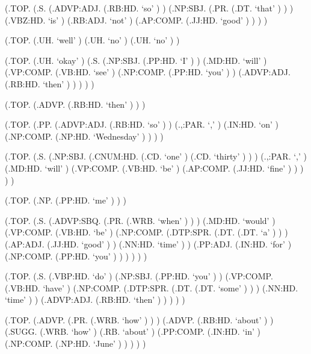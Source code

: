 \documentclass[10pt]{article}
\begin{document}
\begin{parsetree}  (.TOP. (.S. (.ADVP:ADJ. (.RB:HD. `so' ) ) (.NP:SBJ. (.PR. (.DT. `that' ) ) ) (.VBZ:HD. `is' ) (.RB:ADJ. `not' ) (.AP:COMP. (.JJ:HD. `good' ) ) ) ) \end{parsetree}

\begin{parsetree}  (.TOP. (.UH. `well' ) (.UH. `no' ) (.UH. `no' ) ) \end{parsetree}

\begin{parsetree}  (.TOP. (.UH. `okay' ) (.S. (.NP:SBJ. (.PP:HD. `I' ) ) (.MD:HD. `will' ) (.VP:COMP. (.VB:HD. `see' ) (.NP:COMP. (.PP:HD. `you' ) ) (.ADVP:ADJ. (.RB:HD. `then' ) ) ) ) ) \end{parsetree}

\begin{parsetree}  (.TOP. (.ADVP. (.RB:HD. `then' ) ) ) \end{parsetree}

\begin{parsetree}  (.TOP. (.PP. (.ADVP:ADJ. (.RB:HD. `so' ) ) (.,:PAR. `,' ) (.IN:HD. `on' ) (.NP:COMP. (.NP:HD. `Wednesday' ) ) ) ) \end{parsetree}

\begin{parsetree}  (.TOP. (.S. (.NP:SBJ. (.CNUM:HD. (.CD. `one' ) (.CD. `thirty' ) ) ) (.,:PAR. `,' ) (.MD:HD. `will' ) (.VP:COMP. (.VB:HD. `be' ) (.AP:COMP. (.JJ:HD. `fine' ) ) ) ) ) \end{parsetree}

\begin{parsetree}  (.TOP. (.NP. (.PP:HD. `me' ) ) ) \end{parsetree}

\begin{parsetree}  (.TOP. (.S. (.ADVP:SBQ. (.PR. (.WRB. `when' ) ) ) (.MD:HD. `would' ) (.VP:COMP. (.VB:HD. `be' ) (.NP:COMP. (.DTP:SPR. (.DT. (.DT. `a' ) ) ) (.AP:ADJ. (.JJ:HD. `good' ) ) (.NN:HD. `time' ) ) (.PP:ADJ. (.IN:HD. `for' ) (.NP:COMP. (.PP:HD. `you' ) ) ) ) ) ) \end{parsetree}

\begin{parsetree}  (.TOP. (.S. (.VBP:HD. `do' ) (.NP:SBJ. (.PP:HD. `you' ) ) (.VP:COMP. (.VB:HD. `have' ) (.NP:COMP. (.DTP:SPR. (.DT. (.DT. `some' ) ) ) (.NN:HD. `time' ) ) (.ADVP:ADJ. (.RB:HD. `then' ) ) ) ) ) \end{parsetree}

\begin{parsetree}  (.TOP. (.ADVP. (.PR. (.WRB. `how' ) ) ) (.ADVP. (.RB:HD. `about' ) ) (.SUGG. (.WRB. `how' ) (.RB. `about' ) (.PP:COMP. (.IN:HD. `in' ) (.NP:COMP. (.NP:HD. `June' ) ) ) ) ) \end{parsetree}
\end{document}
